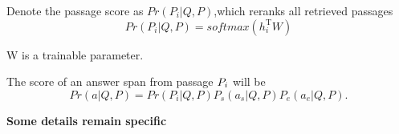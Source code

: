 \documentclass[sigconf]{acmart}
\begin{document}
\begin{enumerate}[(1)]
	Denote the passage score as $Pr(P_i|Q, P)$,which reranks all retrieved passages
		\begin{displaymath}
			Pr(P_i|Q, P) = softmax(h_i^\mathrm{ T }  W)
		\end{displaymath}
			
	W is a trainable parameter.
	
	The score of an answer span from passage $\MakeUppercase{p}_i$ will be
			\begin{displaymath}
			Pr(a| Q, P) = 	Pr(P_i|Q, P)P_s(a_s|Q, P)P_e(a_e|Q, P).
			\end{displaymath}
	
		
		
		
	\end{enumerate} 
   
   	\textbf{Some details remain specific}
   	
\end{document}
